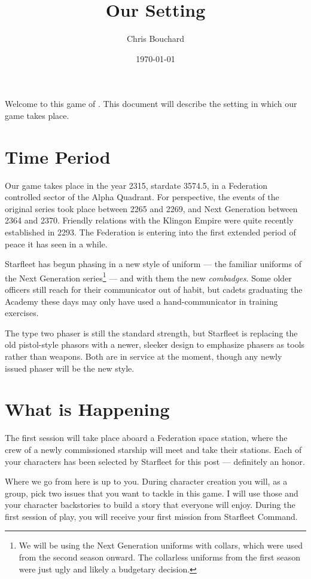 \documentclass[12pt]{article}
\title{Our \STFLogo{} Setting}
\author{Chris Bouchard}
\date{\mydate\today}
\begin{document}
\maketitle

Welcome to this game of \StarTrekFate{}. This document will describe the
setting in which our game takes place.

\section{Time Period}
Our game takes place in the year 2315, stardate 3574.5, in a Federation
controlled sector of the Alpha Quadrant. For perspective, the events of the
original series took place between 2265 and 2269, and Next Generation between
2364 and 2370. Friendly relations with the Klingon Empire were quite recently
established in 2293. The Federation is entering into the first extended period
of peace it has seen in a while.

Starfleet has begun phasing in a new style of uniform --- the familiar uniforms
of the Next Generation series\footnote{We will be using the Next Generation
uniforms with collars, which were used from the second season onward. The
collarless uniforms from the first season were just ugly and likely a budgetary
decision.} --- and with them the new \emph{combadges}. Some older officers
still reach for their communicator out of habit, but cadets graduating the
Academy these days may only have used a hand-communicator in training
exercises.

The type two phaser is still the standard strength, but Starfleet is
replacing the old pistol-style phasors with a newer, sleeker design to
emphasize phasers as tools rather than weapons. Both are in service at the
moment, though any newly issued phaser will be the new style.

\section{What is Happening}
The first session will take place aboard a Federation space station, where the
crew of a newly commissioned  starship will meet and take
their stations. Each of your characters has been selected by Starfleet for this
post --- definitely an honor.

Where we go from here is up to you. During character creation you will, as a
group, pick two issues that you want to tackle in this game. I will use those
and your character backstories to build a story that everyone will enjoy.
During the first session of play, you will receive your first mission from
Starfleet Command.
\end{document}
